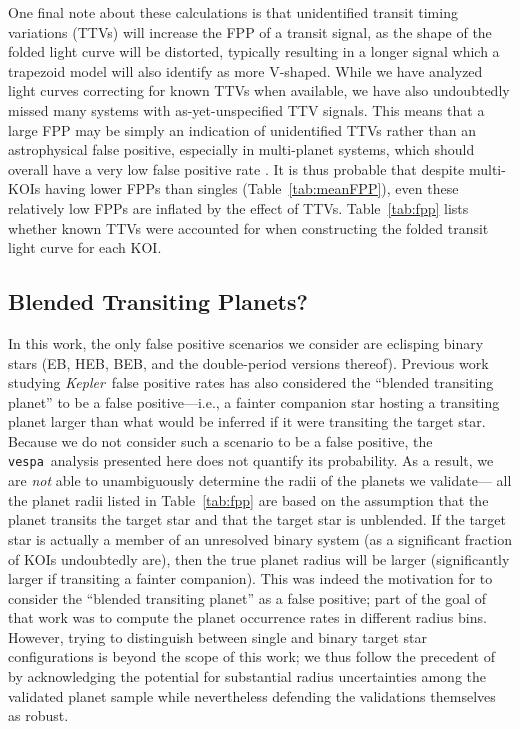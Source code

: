 \documentclass{emulateapj}
\newcommand{\Tab}[1]{Table~\ref{tab:#1}}
\newcommand{\tab}[1]{\Tab{#1}}
\newcommand{\sectlabel}[1]{\label{sect:#1}}
\newcommand{\kepler}{\textit{Kepler}}
\newcommand{\vespa}{\texttt{vespa}}
\begin{document}
One final note about these calculations is that unidentified transit
timing variations (TTVs) will increase the FPP of a transit signal, as
the shape of the folded light curve will be distorted, typically
resulting in a longer signal which a trapezoid model will also
identify as more V-shaped.  While we have analyzed light curves
correcting for known TTVs when available, we have also undoubtedly
missed many systems with as-yet-unspecified TTV signals.  This means
that a large FPP may be simply an indication of unidentified TTVs
rather than an astrophysical false positive, especially in  
multi-planet systems, which should overall have a very low false positive
rate \citep{Lissauer:2014,Rowe:2014}.  It is thus probable that
despite multi-KOIs having lower FPPs than singles (\tab{meanFPP}),
even these relatively low FPPs are inflated by the effect of TTVs.
\Tab{fpp} lists whether known TTVs were accounted for when constructing
the folded transit light curve for each KOI.




\subsection{Blended Transiting Planets?}
\sectlabel{btp}

In this work, the only false positive scenarios we consider are 
eclisping binary stars (EB, HEB, BEB, and the double-period versions
thereof).  Previous work studying \kepler\ false positive rates
\citep[e.g.][]{Fressin:2013} has also considered the  ``blended transiting
planet'' to be a false positive---i.e.,  a fainter companion
star hosting a transiting planet larger than what would be inferred if
it were transiting the target star.  Because we do not consider such
a scenario to be a false positive, the \vespa\ analysis presented here 
does not quantify its probability.  As a result, we are \textit{not}
able to unambiguously determine the radii of the planets we validate---
all the planet radii listed in \tab{fpp} are based on the assumption
that the planet transits the target star and that the target star is 
unblended.  If the target star is actually a member of an unresolved
binary system (as a significant fraction of KOIs undoubtedly are),
then the true planet radius will be larger (significantly larger 
if transiting a fainter companion).  This was indeed the motivation
for \citet{Fressin:2013} to consider the ``blended transiting planet''
as a false positive; part of the goal of that work was to 
compute the planet occurrence rates in different radius bins.  
However, trying to distinguish between single and binary target
star configurations is beyond the scope of this work; we thus follow
the precedent of \citet[][especially Section 5]{Lissauer:2014} by 
acknowledging the potential for substantial radius
uncertainties among the validated planet sample while nevertheless 
defending the validations themselves as robust.   
\end{document}

